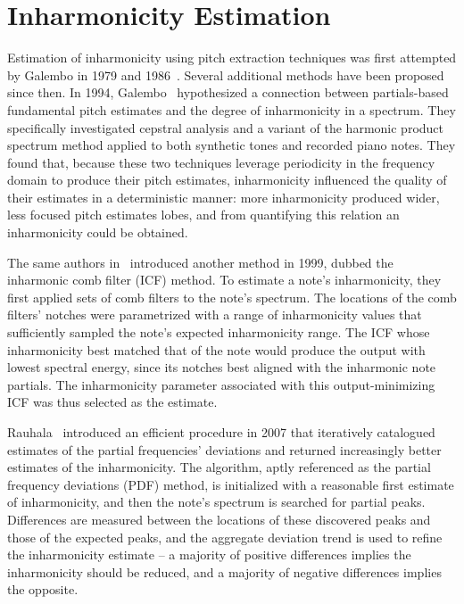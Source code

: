\documentclass[12pt]{cmuthesis}
\begin{document}
\section{Inharmonicity Estimation}
Estimation of inharmonicity using pitch extraction techniques was first attempted by Galembo in 1979 and 1986~\cite{galembo1979,galembo1987}. Several additional methods have been proposed since then. In 1994, Galembo~\cite{galembo1994} hypothesized a connection between partials-based fundamental pitch estimates and the degree of inharmonicity in a spectrum. They specifically investigated cepstral analysis and a variant of the harmonic product spectrum method applied to both synthetic tones and recorded piano notes. They found that, because these two techniques leverage periodicity in the frequency domain to produce their pitch estimates, inharmonicity influenced the quality of their estimates in a deterministic manner: more inharmonicity produced wider, less focused pitch estimates lobes, and from quantifying this relation an inharmonicity could be obtained.
 
 The same authors in~\cite{galembo1999} introduced another method in 1999, dubbed the inharmonic comb filter (ICF) method. To estimate a note's inharmonicity, they first applied sets of comb filters to the note's spectrum. The locations of the comb filters' notches were parametrized with a range of inharmonicity values that sufficiently sampled the note's expected inharmonicity range. The ICF whose inharmonicity best matched that of the note would produce the output with lowest spectral energy, since its notches best aligned with the inharmonic note partials. The inharmonicity parameter associated with this output-minimizing ICF was thus selected as the estimate.
 
Rauhala~\cite{rauhala2007} introduced an efficient procedure in 2007 that iteratively catalogued estimates of the partial frequencies' deviations and returned increasingly better estimates of the inharmonicity. The algorithm, aptly referenced as the partial frequency deviations (PDF) method, is initialized with a reasonable first estimate of inharmonicity, and then the note's spectrum is searched for partial peaks. Differences are measured between the locations of these discovered peaks and those of the expected peaks, and the aggregate deviation trend is used to refine the inharmonicity estimate -- a majority of positive differences implies the inharmonicity should be reduced, and a majority of negative differences implies the opposite.
\end{document}
